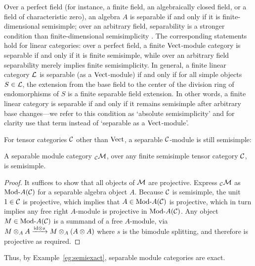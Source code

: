 \documentclass{amsart}
\begin{document}
Over a perfect field (for instance, a finite field, an algebraically closed field, or a field of characteristic zero), an algebra $A$ is separable if and only if it is finite-dimensional semisimple; over an arbitrary field, separability is a stronger condition than finite-dimensional semisimplicity \cite[Ch.~2]{MR0280479}.  The corresponding statements hold for linear categories: over a perfect field, a finite $\mathrm{Vect}$-module category is separable if and only if it is finite semisimple, while over an arbitrary field separability merely implies finite semisimplicity. %
In general, a finite linear category $\mathcal L$ is separable (as a $\mathrm{Vect}$-module) if and only if for all simple objects $S \in \mathcal L$, the extension from the base field to the center of the division ring of endomorphisms of $S$ is a finite separable field extension.  In other words, a finite linear category is separable if and only if it remains semisimple after arbitrary base changes---we refer to this condition as `absolute semisimplicity' and for clarity use that term instead of `separable as a $\mathrm{Vect}$-module'.  %

For tensor categories $\mathcal C$ other than $\mathrm{Vect}$, a separable $\mathcal C$-module is still semisimple:
\begin{proposition} \label{prop:sepmodissemi}
A separable module category ${}_\mathcal C \mathcal M$, over any finite semisimple tensor category $\mathcal C$, is semisimple.
\end{proposition}
\begin{proof}
It suffices to show that all objects of $\mathcal M$ are projective.  Express ${}_\mathcal C \mathcal M$ as $\Mod{}{A}(\cC)$ for a separable algebra object $A$.  Because $\mathcal C$ is semisimple, the unit $1 \in \mathcal C$ is projective, which implies that $A \in \Mod{}{A}(\cC)$ is projective, which in turn implies any free right $A$-module is projective in $\Mod{}{A}(\cC)$.  Any object $M \in \Mod{}{A}(\cC)$ is a summand of a free $A$-module, via $M \otimes_A A \xrightarrow{\mathrm{id} \otimes s} M \otimes_A (A \otimes A)$ where $s$ is the bimodule splitting, and therefore is projective as required.
\end{proof}
\noindent Thus, by Example~\ref{eg:semiexact}, separable module categories are exact.
\end{document}
